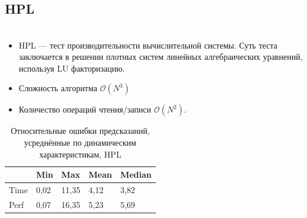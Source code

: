\documentclass[unicode, t, 11pt]{beamer}%
\newlength{\mylen}
\begin{document}
		\subsection{HPL}
		\begin{frame}
			\footnotesize
			\frametitle{\insertsection}
	 		\framesubtitle{\insertsubsection}
	 		\begin{columns}[T]
	 			\setlength{\mylen}{0.45\textwidth}
	 			\begin{column}{\mylen}
	 				\begin{itemize}[label = \(\bullet\)]
				 		\item HPL — тест производительности вычислительной системы.
				 		Суть теста заключается в решении плотных систем линейных алгебраических уравнений, используя LU факторизацию.
				 		\item Сложность алгоритма \(\mathcal{O}(N^3)\)
				 		\item Количество операций чтения/записи \(\mathcal{O}(N^2)\).
				 	\end{itemize}
				 	\begin{table}
			 			\captionsetup{font=tiny, labelfont=tiny}
			 			\tiny
							\begin{tabularx}{\textwidth}{|X|X|X|X|X|}%
								\hline
								     & Min  & Max   & Mean & Median \\ \hline
								Time & 0,02 & 11,35 & 4,12 & 3,82   \\ \hline
								Perf & 0,07 & 16,35 & 5,23 & 5,69   \\ \hline
							\end{tabularx}
						\caption{Относительные ошибки предсказаний, усреднённые по динамическим характеристикам, HPL}
					\end{table}
				 			

\end{column}
\end{columns}
\end{frame}
\end{document}
